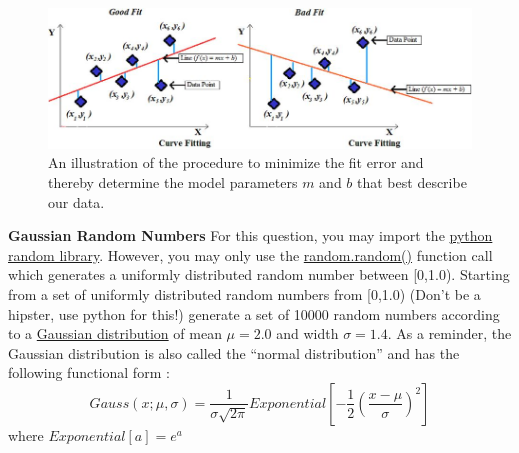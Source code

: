 \documentclass[12pt]{article}
\begin{document}
\begin{figure}[h!]
  \center
  \includegraphics[width=0.7\linewidth]{fit}
  \caption{An illustration of the procedure to minimize the fit error and thereby determine the model parameters $m$ and $b$ that best describe our data.}
  \label{fig:fit}
\end{figure}

\newpage
\textbf{Gaussian Random Numbers} 
\newline
For this question, you may import the \href{https://docs.python.org/2/library/random.html}{python random library}.  However, you may only use the \href{https://docs.python.org/2/library/random.html#random.random}{random.random()} function call which generates a uniformly distributed random number between [0,1.0).
\newline
\newline
Starting from a set of uniformly distributed random numbers from [0,1.0) (Don't be a hipster, use python for this!) generate a set of 10000 random numbers according to a \href{https://en.wikipedia.org/wiki/Gaussian_function}{Gaussian distribution} of mean $\mu=2.0$ and width $\sigma=1.4$.  As a reminder, the Gaussian distribution is also called the ``normal distribution'' and has the following functional form :
\begin{displaymath}
 Gauss(x;\mu,\sigma)=\frac{1}{\sigma\sqrt{2\pi}}Exponential[-\frac{1}{2} (\frac{x-\mu}{\sigma})^{2}]
\end{displaymath}
where $Exponential[a]=e^{a}$
\end{document}
